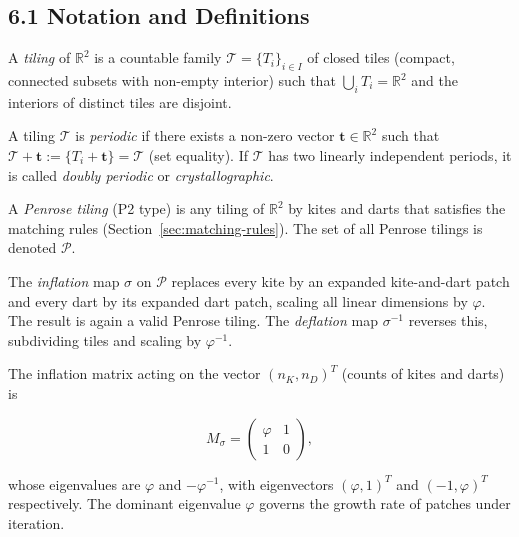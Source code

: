 \subsection{6.1 Notation and Definitions}
\label{sec:aperiodic-defs}

\begin{definition}[Tiling]
A \emph{tiling} of \(\mathbb{R}^2\) is a
countable family \(\mathcal{T} = \{T_i\}_{i \in I}\)
of closed tiles (compact, connected subsets with
non-empty interior) such that
\(\bigcup_{i} T_i = \mathbb{R}^2\) and the
interiors of distinct tiles are disjoint.
\end{definition}

\begin{definition}
A tiling \(\mathcal{T}\) is \emph{periodic} if
there exists a non-zero vector
\(\mathbf{t} \in \mathbb{R}^2\) such that
\(\mathcal{T} + \mathbf{t} := \{T_i + \mathbf{t}\}
= \mathcal{T}\) (set equality). If \(\mathcal{T}\)
has two linearly independent periods, it is called
\emph{doubly periodic} or \emph{crystallographic}.
\end{definition}

\begin{definition}
A \emph{Penrose tiling} (P2 type) is any tiling
of \(\mathbb{R}^2\) by kites and darts that
satisfies the matching rules
(Section~\ref{sec:matching-rules}). The set of
all Penrose tilings is denoted \(\mathcal{P}\).
\end{definition}

\begin{definition}
\label{def:inflation}
The \emph{inflation} map \(\sigma\) on
\(\mathcal{P}\) replaces every kite by an expanded
kite-and-dart patch and every dart by its expanded
dart patch, scaling all linear dimensions by
\(\varphi\). The result is again a valid Penrose
tiling. The \emph{deflation} map
\(\sigma^{-1}\) reverses this, subdividing tiles
and scaling by \(\varphi^{-1}\).
\end{definition}

The inflation matrix acting on the vector
\((n_K, n_D)^T\) (counts of kites and darts) is

\[M_\sigma = \begin{pmatrix} \varphi & 1 \\ 1 & 0 \end{pmatrix},\]

whose eigenvalues are \(\varphi\) and
\(-\varphi^{-1}\), with eigenvectors
\(({\varphi}, 1)^T\) and
\((-1, \varphi)^T\) respectively. The dominant
eigenvalue \(\varphi\) governs the growth rate of
patches under iteration.

